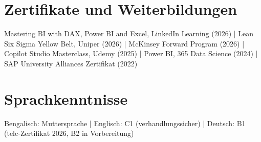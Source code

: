 \documentclass[10pt,a4paper]{article}
\begin{document}
\section{Zertifikate und Weiterbildungen}
{\small
Mastering BI with DAX, Power BI and Excel, LinkedIn Learning (2026) | Lean Six Sigma Yellow Belt, Uniper (2026) | McKinsey Forward Program (2026) | Copilot Studio Masterclass, Udemy (2025) | Power BI, 365 Data Science (2024) | SAP University Alliances Zertifikat (2022)\par}

\section{Sprachkenntnisse}
Bengalisch: Muttersprache | Englisch: C1 (verhandlungssicher) | Deutsch: B1 (telc-Zertifikat 2026, B2 in Vorbereitung)
\end{document}

